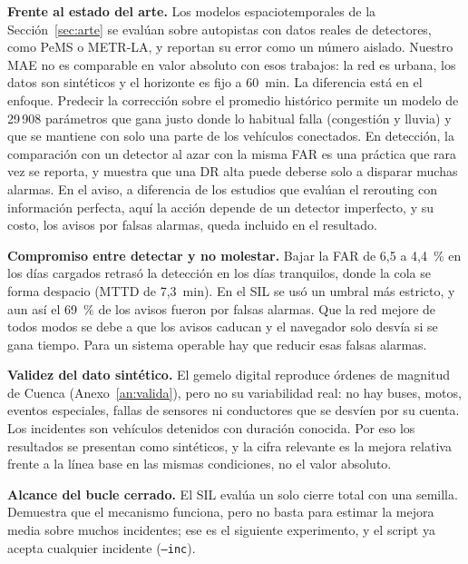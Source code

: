 \textbf{Frente al estado del arte.} Los modelos espaciotemporales de la Sección~\ref{sec:arte} se evalúan sobre autopistas con datos reales de detectores, como PeMS o METR-LA, y reportan su error como un número aislado. Nuestro MAE no es comparable en valor absoluto con esos trabajos: la red es urbana, los datos son sintéticos y el horizonte es fijo a 60~min. La diferencia está en el enfoque. Predecir la corrección sobre el promedio histórico permite un modelo de 29\,908 parámetros que gana justo donde lo habitual falla (congestión y lluvia) y que se mantiene con solo una parte de los vehículos conectados. En detección, la comparación con un detector al azar con la misma FAR es una práctica que rara vez se reporta, y muestra que una DR alta puede deberse solo a disparar muchas alarmas. En el aviso, a diferencia de los estudios que evalúan el rerouting con información perfecta, aquí la acción depende de un detector imperfecto, y su costo, los avisos por falsas alarmas, queda incluido en el resultado.

\textbf{Compromiso entre detectar y no molestar.} Bajar la FAR de 6,5 a 4,4~\% en los días cargados retrasó la detección en los días tranquilos, donde la cola se forma despacio (MTTD de 7,3~min). En el SIL se usó un umbral más estricto, y aun así el 69~\% de los avisos fueron por falsas alarmas. Que la red mejore de todos modos se debe a que los avisos caducan y el navegador solo desvía si se gana tiempo. Para un sistema operable hay que reducir esas falsas alarmas.

\textbf{Validez del dato sintético.} El gemelo digital reproduce órdenes de magnitud de Cuenca (Anexo~\ref{an:valida}), pero no su variabilidad real: no hay buses, motos, eventos especiales, fallas de sensores ni conductores que se desvíen por su cuenta. Los incidentes son vehículos detenidos con duración conocida. Por eso los resultados se presentan como sintéticos, y la cifra relevante es la mejora relativa frente a la línea base en las mismas condiciones, no el valor absoluto.

\textbf{Alcance del bucle cerrado.} El SIL evalúa un solo cierre total con una semilla. Demuestra que el mecanismo funciona, pero no basta para estimar la mejora media sobre muchos incidentes; ese es el siguiente experimento, y el script ya acepta cualquier incidente (\texttt{--inc}).
